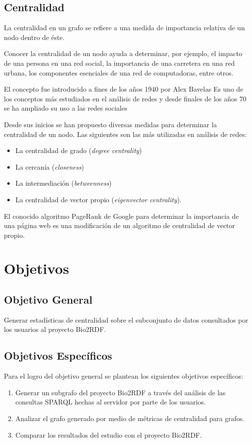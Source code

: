 \documentclass[spanish, fleqn, twocolumn]{IEEEtran/IEEEtran}
\begin{document}
\subsection{Centralidad}
La centralidad en un grafo se refiere a una medida de importancia relativa de un
nodo dentro de éste.\cite{borgatti2005centrality}

Conocer la centralidad de un nodo ayuda a determinar, por ejemplo, el impacto
de una persona en una red social, la importancia de una carretera en una red
urbana, los componentes esenciales de una red de computadoras, entre otros.

El concepto fue introducido a fines de los años 1940 por Alex
Bavelas\cite{bavelas1948mathematical}
Es uno de los conceptos más estudiados en el análisis de redes y desde finales
de los años 70 se ha ampliado su uso a las redes
sociales\cite{freeman1979centrality}

Desde sus inicios se han propuesto diversas medidas para determinar la
centralidad de un nodo. Las siguientes son las más utilizadas en análisis de
redes:
\begin{itemize}
  \item La centralidad de grado (\emph{degree centrality})
  \item La cercanía (\emph{closeness})
  \item La intermediación (\emph{betweenness})
  \item La centralidad de vector propio (\emph{eigenvector centrality}).
\end{itemize}

El conocido algoritmo PageRank de Google para determinar la importancia de una
página web es una modificación de un algoritmo de centralidad de vector propio.

\section{Objetivos}
\subsection{Objetivo General}
Generar estadísticas de centralidad sobre el subconjunto de datos consultados
por los usuarios al proyecto Bio2RDF.

\subsection{Objetivos Específicos}
Para el logro del objetivo general se plantean los siguientes objetivos
específicos:
\begin{enumerate}
  \item
    Generar un subgrafo del proyecto Bio2RDF a través del análisis de las
    consultas SPARQL hechas al servidor por parte de los usuarios.
  \item
    Analizar el grafo generado por medio de métricas de centralidad para grafos.
  \item
    Comparar los resultados del estudio con el proyecto Bio2RDF.
\end{enumerate}
\end{document}
